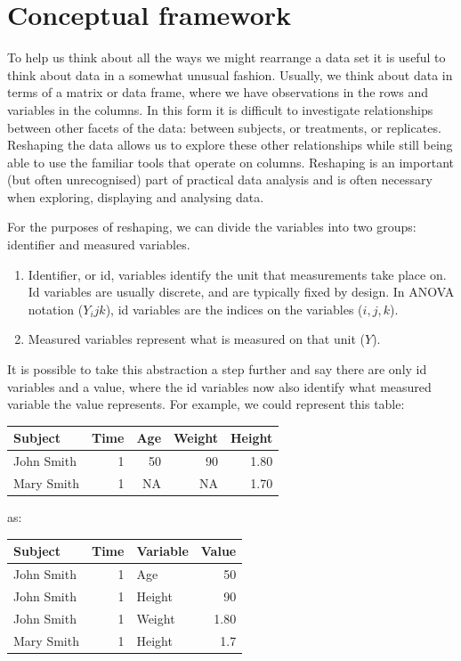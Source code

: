 \documentclass[]{article}
\begin{document}
\section{Conceptual framework}

To help us think about all the ways we might rearrange a data set it is useful to think about data in a somewhat unusual fashion.  Usually, we think about data in terms of a matrix or data frame, where we have observations in the rows and variables in the columns.  In this form it is difficult to investigate relationships between other facets of the data: between subjects, or treatments, or replicates.  Reshaping the data allows us to explore these other relationships while still being able to use the familiar tools that operate on columns.  Reshaping is an important (but often unrecognised) part of practical data analysis and is often necessary when exploring, displaying and analysing data.

For the purposes of reshaping, we can divide the variables into two groups: identifier and measured variables.

\begin{enumerate}
	\item Identifier, or id, variables identify the unit that measurements take place on.  Id variables are usually discrete, and are typically fixed by design.  In ANOVA notation ($Y_ijk$), id variables are the indices on the variables ($i, j, k$).
	\item Measured variables represent what is measured on that unit ($Y$).
\end{enumerate}

It is possible to take this abstraction a step further and say there are only id variables and a value, where the id variables now also identify what measured variable the value represents.  For example, we could represent this table:

\bigskip
\begin{tabular}{|l|r||r|r|r|}\hline
	Subject & Time & Age & Weight & Height \\\hline
	John Smith & 1 & 50 & 90 & 1.80\\\hline
	Mary Smith & 1 & NA & NA & 1.70\\\hline
\end{tabular}

\bigskip
\noindent as:
\bigskip

\begin{tabular}{|l|r|l||r|}\hline
	Subject & Time & Variable & Value \\\hline
	John Smith & 1 & Age & 50 \\\hline
	John Smith & 1 & Height & 90 \\\hline
	John Smith & 1 & Weight & 1.80 \\\hline
	Mary Smith & 1 & Height & 1.7\\\hline
\end{tabular}
\end{document}
